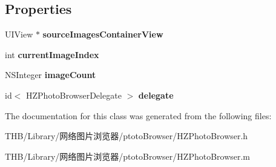 \subsection*{Properties}
\begin{DoxyCompactItemize}
\item 
\mbox{\label{interface_h_z_photo_browser_a6542b85d5375fd051eed130323519ac9}} 
U\+I\+View $\ast$ {\bfseries source\+Images\+Container\+View}
\item 
\mbox{\label{interface_h_z_photo_browser_a3c8a91a3f7535fb2a488b0ebd5d12037}} 
int {\bfseries current\+Image\+Index}
\item 
\mbox{\label{interface_h_z_photo_browser_ace54a474f66bd2fc493d37c454a2a736}} 
N\+S\+Integer {\bfseries image\+Count}
\item 
\mbox{\label{interface_h_z_photo_browser_a98a5dc69353103eb6277e7eaab57e2f4}} 
id$<$ H\+Z\+Photo\+Browser\+Delegate $>$ {\bfseries delegate}
\end{DoxyCompactItemize}


The documentation for this class was generated from the following files\+:\begin{DoxyCompactItemize}
\item 
T\+H\+B/\+Library/网络图片浏览器/ptoto\+Browser/H\+Z\+Photo\+Browser.\+h\item 
T\+H\+B/\+Library/网络图片浏览器/ptoto\+Browser/H\+Z\+Photo\+Browser.\+m\end{DoxyCompactItemize}
